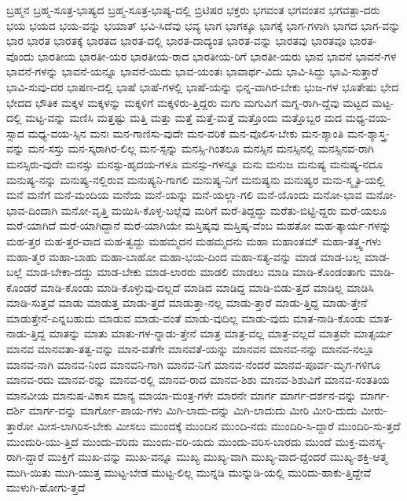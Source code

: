 {ಬ್ರಹ್ಮನ
ಬ್ರಹ್ಮ-ಸೂತ್ರ-ಭಾಷ್ಯದ
ಬ್ರಹ್ಮ-ಸೂತ್ರ-ಭಾಷ್ಯ-ದಲ್ಲಿ
ಬ್ರಿಟಿಷರ
ಭಕ್ತರು
ಭಗವಂತ
ಭಗವಂತನ
ಭಗವತ್ಪಾ-ದರು
ಭಯ
ಭಯದ
ಭಯ-ವನ್ನು
ಭಯಾತ್
ಭವಿ-ಸಿದೆವು
ಭವ್ಯ
ಭಾಗ
ಭಾಗಕ್ಕೂ
ಭಾಗಕ್ಕೆ
ಭಾಗ-ಗಳಾಗಿ
ಭಾಗದ
ಭಾಗ-ವನ್ನು
ಭಾರ
ಭಾರತ
ಭಾರತಕ್ಕೆ
ಭಾರತದ
ಭಾರತ-ದಲ್ಲಿ
ಭಾರತ-ದಾದ್ಯಂತ
ಭಾರತ-ವನ್ನು
ಭಾರತವು
ಭಾರತವೂ
ಭಾರತ-ವೊಂದು
ಭಾರತೀಯ
ಭಾರತೀ-ಯರ
ಭಾರತೀಯ-ರಾದ
ಭಾರತೀಯ-ರಿಗೆ
ಭಾರತೀ-ಯರು
ಭಾವ
ಭಾವನೆ
ಭಾವನೆ-ಗಳ
ಭಾವನೆ-ಗಳನ್ನು
ಭಾವನೆ-ಯನ್ನೂ
ಭಾವನೆ-ಯಿದು
ಭಾವ-ಯಂತಃ
ಭಾವಾರ್ಥ-ವಿದು
ಭಾವಿ-ಸಿದ್ದು
ಭಾವಿ-ಸುತ್ತಾರೆ
ಭಾವಿ-ಸುವು-ದರ
ಭಾಷಣ-ದಲ್ಲಿ
ಭಾಷೆ
ಭಾಷೆ-ಗಳಲ್ಲಿ
ಭಾಷೆ-ಯನ್ನು
ಭಿನ್ನ-ವಾಗಿರ-ಬೇಕು
ಭುಜ-ಗಳ
ಭೂತೇಷು
ಭೇದ
ಭೇದದ
ಭೌತಿಕ
ಮಕ್ಕಳ
ಮಕ್ಕಳನ್ನು
ಮಕ್ಕಳಿಗೆ
ಮಕ್ಕಳಿರು-ತ್ತಿದ್ದರು
ಮಗು
ಮಗುವಿಗೆ
ಮಗ್ನ-ರಾಗಿ-ದ್ದೆವು
ಮಟ್ಟದ
ಮಟ್ಟ-ದಲ್ಲಿ
ಮಟ್ಟ-ವನ್ನು
ಮಣಿಸಿ
ಮತ್ತಷ್ಟು
ಮತ್ತಿ
ಮತ್ತು
ಮತ್ತೆ
ಮತ್ತೆ-ಮತ್ತೆ
ಮತ್ತೊಂದು
ಮತ್ತೊಬ್ಬರ
ಮದ
ಮಧ್ಯ-ವಯ-ಸ್ಸಾದ
ಮಧ್ಯ-ವಯ-ಸ್ಸಿನ
ಮನಃ
ಮನ-ಗಾಣಿಸು-ವುದೇ
ಮನ-ವರಿಕೆ
ಮನ-ವೊಲಿಸ-ಬೇಕು
ಮನ-ಶ್ಶಾಂತಿ
ಮನ-ಶ್ಶಾಸ್ತ್ರ-ವನ್ನು
ಮನ-ಸಸ್ತು
ಮನ-ಸ್ಕರಾಗಿರ-ಲಿಲ್ಲ
ಮನ-ಸ್ಸನ್ನು
ಮನಸ್ಸಿ-ಗಿಂತಲೂ
ಮನಸ್ಸಿನ
ಮನಸ್ಸಿನಲ್ಲಿ
ಮನಸ್ಸಿನವ-ರಾಗಿ
ಮನಸ್ಸಿರು-ವುದೇ
ಮನಸ್ಸು
ಮನಸ್ಸು-ಹೃದಯ-ಗಳೂ
ಮನಸ್ಸು-ಗಳನ್ನೂ
ಮನು
ಮನುಜ
ಮನುಷ್ಯ
ಮನುಷ್ಯ-ನದೂ
ಮನುಷ್ಯ-ನನ್ನು
ಮನುಷ್ಯ-ನಲ್ಲಿರುವ
ಮನುಷ್ಯನಿ-ಗಾಗಲಿ
ಮನುಷ್ಯ-ನಿಗೆ
ಮನುಷ್ಯನು
ಮನುಷ್ಯರ
ಮನು-ಸ್ಮೃತಿ-ಯಲ್ಲಿ
ಮನೆ
ಮನೆಗೆ
ಮನೆ-ಮಂದಿಯ
ಮನೆಯ
ಮನೆ-ಯನ್ನು
ಮನೆ-ಯಲ್ಲಾ-ಗಲಿ
ಮನೆ-ಯೊಂದು
ಮನೋ-ಭಾವ
ಮನೋ-ಭಾವ-ದಿಂದಾಗಿ
ಮನೋ-ವೃತ್ತಿ
ಮಯಿಸಿ-ಕೊಳ್ಳ-ಬಲ್ಲೆವು
ಮರಿಗೆ
ಮರೆ-ತಿದ್ದದ್ದು
ಮರೆತು-ಬಿಟ್ಟಿ-ದ್ದರು
ಮರೆ-ಯಲೂ
ಮರೆ-ಯಾಗಿದೆ
ಮರೆ-ಯಾಗಿದ್ದಾನೆ
ಮರೆ-ಯಾಗಿಯೇ
ಮಸ್ತಿಷ್ಕವು
ಮಸ್ತಿಷ್ಕ-ವೆಂಬ
ಮಹತೋ
ಮಹ-ತ್ಕಾರ್ಯ-ಗಳನ್ನು
ಮಹ-ತ್ತರ
ಮಹ-ತ್ತರ-ವಾದ
ಮಹ-ತ್ವದ್ದು
ಮಹಮ್ಮದನ
ಮಹಮ್ಮದನು
ಮಹಾ
ಮಹಾಂತಮ್
ಮಹಾ-ತತ್ತ್ವ-ಗಳು
ಮಹಾ-ತ್ಮರ
ಮಹಾ-ಬಾಹು
ಮಹಾ-ಬಾಹೋ
ಮಹಾ-ಭಯ-ದಿಂದ
ಮಹಾ-ಸತ್ಯ-ವನ್ನು
ಮಾಡ
ಮಾಡ-ಬಲ್ಲ
ಮಾಡ-ಬಲ್ಲೆ
ಮಾಡ-ಬೇಕಾ-ದದ್ದು
ಮಾಡ-ಬೇಕು
ಮಾಡ-ಲಾರರು
ಮಾಡಲಿ
ಮಾಡಲು
ಮಾಡಿ
ಮಾಡಿ-ಕೊಂಡಂತಾಗು
ಮಾಡಿ-ಕೊಂಡರೆ
ಮಾಡಿ-ಕೊಂಡು
ಮಾಡಿ-ಕೊಳ್ಳುವು-ದಲ್ಲದೆ
ಮಾಡಿದ
ಮಾಡಿದ್ದ
ಮಾಡಿ-ಬಿಡು-ತ್ತದೆ
ಮಾಡಿಲ್ಲ
ಮಾಡಿಸಿ
ಮಾಡಿ-ಸುತ್ತವೆ
ಮಾಡು
ಮಾಡುತ್ತ
ಮಾಡು-ತ್ತದೆ
ಮಾಡುತ್ತಾ-ನಲ್ಲ
ಮಾಡು-ತ್ತಾರೆ
ಮಾಡು-ತ್ತಿದ್ದ
ಮಾಡು-ತ್ತೇನೆ
ಮಾಡುತ್ತೇನೆ-ಎನ್ನಬಹುದು
ಮಾಡುವ
ಮಾಡು-ವಂತೆ
ಮಾಡು-ವುದಿಲ್ಲ
ಮಾಡು-ವುದು
ಮಾತ-ನಾಡಿ-ಕೊಂಡು
ಮಾತ-ನಾಡು-ತ್ತಿದ್ದ
ಮಾತನ್ನು
ಮಾತು
ಮಾತು-ಗಳ-ನ್ನಾಡು-ತ್ತೇನೆ
ಮಾತ್ರ
ಮಾತ್ರ-ವಲ್ಲ
ಮಾತ್ರ-ವಲ್ಲದೆ
ಮಾತ್ರವೇ
ಮಾತ್ಸರ್ಯ
ಮಾನವ
ಮಾನವತಾ-ತತ್ವ-ವನ್ನು
ಮಾನ-ವತೆಗೇ
ಮಾನವತೆ-ಯನ್ನು
ಮಾನವನ
ಮಾನವ-ನನ್ನು
ಮಾನವ-ನಲ್ಲೂ
ಮಾನವ-ನಾಗಿ
ಮಾನವ-ನಿಂದ
ಮಾನವನಿ-ಗಾಗಿ
ಮಾನವ-ನಿಗೆ
ಮಾನವ-ನೆಂದರೆ
ಮಾನವ-ಪೂರ್ವ-ಮೃಗ-ಗಳಿಗೂ
ಮಾನವ-ರದು
ಮಾನವ-ರನ್ನು
ಮಾನವ-ರಲ್ಲಿ
ಮಾನವ-ರಾದ
ಮಾನವ-ಶಿಶು
ಮಾನವ-ಶಿಶುವಿಗೆ
ಮಾನವ-ಸಂತತಿಯ
ಮಾನವೀಯ
ಮಾನುಷ-ವಿಕಾಸ
ಮಾನ್ಯ
ಮಾಯಾ-ಮಂತ್ರ-ಗಳೇ
ಮಾರನೇ
ಮಾರ್ಗ
ಮಾರ್ಗ-ದರ್ಶನ-ವನ್ನು
ಮಾರ್ಗ-ದರ್ಶಿ
ಮಾರ್ಗ-ವನ್ನು
ಮಾರ್ಗೋ-ಪಾಯ-ಗಳು
ಮಿಗಿ-ಲಾದು-ದನ್ನು
ಮಿಗಿ-ಲಾದುದು
ಮೀರಿ
ಮೀರಿ-ದುದು
ಮೀರು-ತ್ತಾರೋ
ಮೀಸ-ಲಾಗಿರಿಸ-ಬೇಕು
ಮೀಸಲು
ಮುಂದಕ್ಕೆ
ಮುಂದಿನ
ಮುಂದಿ-ನದು
ಮುಂದಿರಿ-ಸಿ-ದ್ದಾರೆ
ಮುಂದಿರಿ-ಸು-ತ್ತದೆ
ಮುಂದುರಿ-ಯು-ತ್ತಿದೆ
ಮುಂದು-ವರಿದು
ಮುಂದು-ವರಿ-ಯದು
ಮುಂದು-ವರಿಸ-ಬಾರದು
ಮುಂದೆ
ಮುಕ್ತ-ಮನಸ್ಕ-ರಾಗಿ-ದ್ದಾರೆ
ಮುಕ್ತಿಗೆ
ಮುಖ-ವನ್ನು
ಮುಖ-ವನ್ನೂ
ಮುಖ್ಯ
ಮುಖ್ಯ-ವಾಗಿ
ಮುಖ್ಯ-ವಾದ-ದ್ದೆಂದರೆ
ಮುಖ್ಯ-ಶಕ್ತಿ-ಆತ್ಮ
ಮುಗಿ-ಯಿತು
ಮುಗಿ-ಯುತ್ತ
ಮುಟ್ಟ-ಬೇಡ
ಮುಟ್ಟ-ಲಿಲ್ಲ
ಮುನ್ನಡಿ
ಮುನ್ನುಡಿ-ಯಲ್ಲಿ
ಮುರಿದು-ಹಾಕು-ತ್ತಿದ್ದೇವೆ
ಮುಳುಗಿ-ಹೋಗು-ತ್ತದೆ
}
